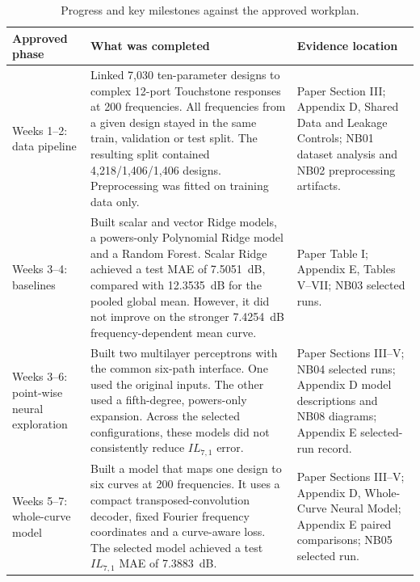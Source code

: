 \begin{table}[!htbp]
    \caption{Progress and key milestones against the approved workplan.}
    \label{tab:appendix-c-progress}
    \centering
    \scriptsize
    \begin{tabular}{@{}p{}p{}
                         p{}@{}}
        \toprule
        Approved phase & What was completed & Evidence location \\
        \midrule
        Weeks 1--2:
        data pipeline
          & Linked 7,030 ten-parameter designs to complex 12-port Touchstone
            responses at 200 frequencies. All frequencies from a given design
            stayed in the same train, validation or test split. The resulting
            split contained 4,218/1,406/1,406 designs. Preprocessing was fitted
            on training data only.
          & Paper Section III; Appendix D, Shared Data and Leakage Controls;
            NB01 dataset analysis and NB02 preprocessing artifacts. \\
        Weeks 3--4:
        baselines
          & Built scalar and vector Ridge models, a powers-only Polynomial
            Ridge model and a Random Forest. Scalar Ridge achieved a test MAE
            of 7.5051~dB, compared with 12.3535~dB for the pooled global mean.
            However, it did not improve on the stronger 7.4254~dB
            frequency-dependent mean curve.
          & Paper Table I; Appendix E, Tables V--VII; NB03 selected runs. \\
        Weeks 3--6:
        point-wise neural exploration
          & Built two multilayer perceptrons with the common six-path interface.
            One used the original inputs. The other used a fifth-degree,
            powers-only expansion. Across the selected configurations, these
            models did not consistently reduce $IL_{7,1}$ error.
          & Paper Sections III--V; NB04 selected runs; Appendix D model
            descriptions and NB08 diagrams; Appendix E selected-run record. \\
        Weeks 5--7:
        whole-curve model
          & Built a model that maps one design to six curves at 200 frequencies.
            It uses a compact transposed-convolution decoder, fixed Fourier
            frequency coordinates and a curve-aware loss. The selected model
            achieved a test $IL_{7,1}$ MAE of 7.3883~dB.
          & Paper Sections III--V; Appendix D, Whole-Curve Neural Model;
            Appendix E paired comparisons; NB05 selected run. \\

\end{tabular}
\end{table}
